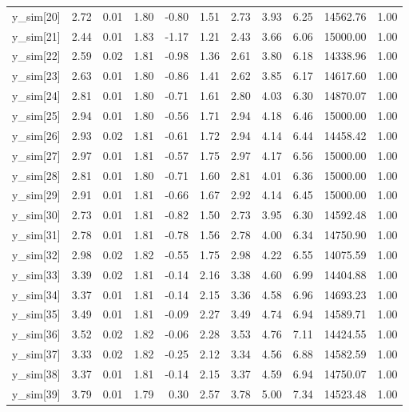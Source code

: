 \begin{table}[ht]
\begin{tabular}{rrrrrrrrrrr}
  y\_sim[20] & 2.72 & 0.01 & 1.80 & -0.80 & 1.51 & 2.73 & 3.93 & 6.25 & 14562.76 & 1.00 \\ 
  y\_sim[21] & 2.44 & 0.01 & 1.83 & -1.17 & 1.21 & 2.43 & 3.66 & 6.06 & 15000.00 & 1.00 \\ 
  y\_sim[22] & 2.59 & 0.02 & 1.81 & -0.98 & 1.36 & 2.61 & 3.80 & 6.18 & 14338.96 & 1.00 \\ 
  y\_sim[23] & 2.63 & 0.01 & 1.80 & -0.86 & 1.41 & 2.62 & 3.85 & 6.17 & 14617.60 & 1.00 \\ 
  y\_sim[24] & 2.81 & 0.01 & 1.80 & -0.71 & 1.61 & 2.80 & 4.03 & 6.30 & 14870.07 & 1.00 \\ 
  y\_sim[25] & 2.94 & 0.01 & 1.80 & -0.56 & 1.71 & 2.94 & 4.18 & 6.46 & 15000.00 & 1.00 \\ 
  y\_sim[26] & 2.93 & 0.02 & 1.81 & -0.61 & 1.72 & 2.94 & 4.14 & 6.44 & 14458.42 & 1.00 \\ 
  y\_sim[27] & 2.97 & 0.01 & 1.81 & -0.57 & 1.75 & 2.97 & 4.17 & 6.56 & 15000.00 & 1.00 \\ 
  y\_sim[28] & 2.81 & 0.01 & 1.80 & -0.71 & 1.60 & 2.81 & 4.01 & 6.36 & 15000.00 & 1.00 \\ 
  y\_sim[29] & 2.91 & 0.01 & 1.81 & -0.66 & 1.67 & 2.92 & 4.14 & 6.45 & 15000.00 & 1.00 \\ 
  y\_sim[30] & 2.73 & 0.01 & 1.81 & -0.82 & 1.50 & 2.73 & 3.95 & 6.30 & 14592.48 & 1.00 \\ 
  y\_sim[31] & 2.78 & 0.01 & 1.81 & -0.78 & 1.56 & 2.78 & 4.00 & 6.34 & 14750.90 & 1.00 \\ 
  y\_sim[32] & 2.98 & 0.02 & 1.82 & -0.55 & 1.75 & 2.98 & 4.22 & 6.55 & 14075.59 & 1.00 \\ 
  y\_sim[33] & 3.39 & 0.02 & 1.81 & -0.14 & 2.16 & 3.38 & 4.60 & 6.99 & 14404.88 & 1.00 \\ 
  y\_sim[34] & 3.37 & 0.01 & 1.81 & -0.14 & 2.15 & 3.36 & 4.58 & 6.96 & 14693.23 & 1.00 \\ 
  y\_sim[35] & 3.49 & 0.01 & 1.81 & -0.09 & 2.27 & 3.49 & 4.74 & 6.94 & 14589.71 & 1.00 \\ 
  y\_sim[36] & 3.52 & 0.02 & 1.82 & -0.06 & 2.28 & 3.53 & 4.76 & 7.11 & 14424.55 & 1.00 \\ 
  y\_sim[37] & 3.33 & 0.02 & 1.82 & -0.25 & 2.12 & 3.34 & 4.56 & 6.88 & 14582.59 & 1.00 \\ 
  y\_sim[38] & 3.37 & 0.01 & 1.81 & -0.14 & 2.15 & 3.37 & 4.59 & 6.94 & 14750.07 & 1.00 \\ 
  y\_sim[39] & 3.79 & 0.01 & 1.79 & 0.30 & 2.57 & 3.78 & 5.00 & 7.34 & 14523.48 & 1.00 \\ 

\end{tabular}
\end{table}
